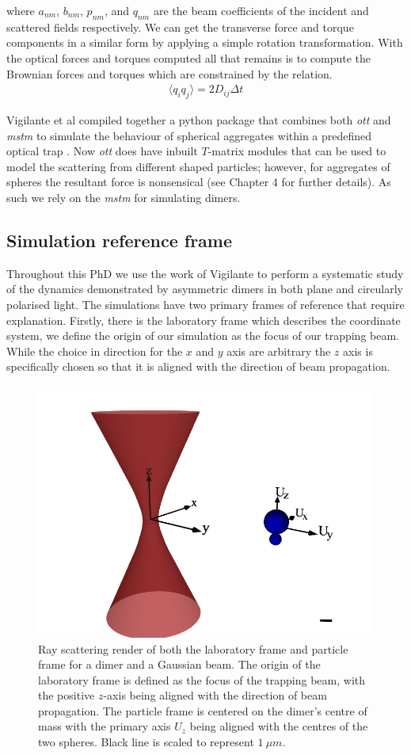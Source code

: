 where $a_{nm}$, $b_{nm}$, $p_{nm}$, and $q_{nm}$ are the beam coefficients
of the incident and scattered fields respectively. We can get the transverse 
force and torque components in a similar form by applying a simple rotation 
transformation. With the optical forces and torques computed all that remains
is to compute the Brownian forces and torques which are constrained by the relation.
\begin{align}
	\langle q_iq_j\rangle =2D_{ij}\Delta t
\end{align}

Vigilante et al compiled together a python package that combines both 
\textit{ott} and \textit{mstm} to simulate the behaviour of spherical 
aggregates within a predefined optical trap \cite{Vigilante2020}. Now 
\textit{ott} does have inbuilt $T$-matrix modules that can be used to 
model the scattering from different shaped particles; however, for 
aggregates of spheres the resultant force is nonsensical (see Chapter 
4 for further details). As such we rely on the \textit{mstm} for 
simulating dimers.  

\subsection{Simulation reference frame}
\label{sec:sim_parameters}
Throughout this PhD we use the work of Vigilante to perform a systematic 
study of the dynamics demonstrated by asymmetric dimers in both plane and 
circularly polarised light. The simulations have two primary frames of 
reference that require explanation. Firstly, there is the laboratory frame 
which describes the coordinate system, we define the origin of our simulation
as the focus of our trapping beam. While the choice in direction for the $x$ 
and $y$ axis are arbitrary the $z$ axis is specifically chosen so that it is 
aligned with the direction of beam propagation. 
\begin{figure}[h!]
	\centering
	\includegraphics[width=0.6\linewidth]{lab_frame.png}
	\caption{Ray scattering render of both the laboratory frame and particle 
		frame for a dimer and a Gaussian beam. The origin of the laboratory 
		frame is defined as the focus of the trapping beam, with the positive 
		$z$-axis being aligned with the direction of beam propagation. The 
		particle frame is centered on the dimer's centre of mass with the 
		primary axis $U_z$ being aligned with the centres of the two spheres.
		Black line is scaled to represent $1\ \mu m$.}
	\label{fig:lab_frame} 
\end{figure} 

